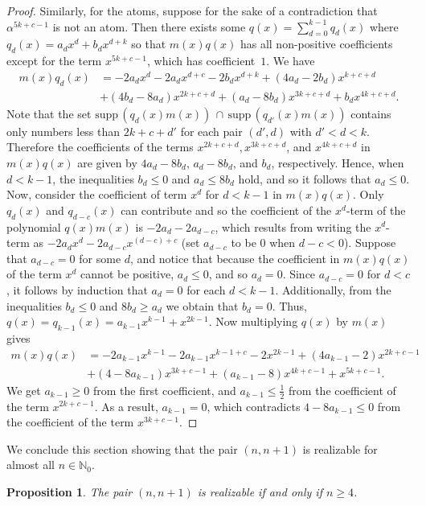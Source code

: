 \documentclass[11pt]{amsart}
\newtheorem{proposition}[theorem]{Proposition}
\theoremstyle{definition}
\theoremstyle{remark}
\numberwithin{equation}{section}
\newcommand{\nn}{\mathbb{N}}
\newcommand{\supp}{\text{supp}\,}
\begin{document}
\begin{proof}
    Similarly, for the atoms, suppose for the sake of a contradiction that $\alpha^{5k+c-1}$ is not an atom. Then there exists some $q(x)=\sum_{d=0}^{k-1}q_d(x)$ where $q_d(x)=a_dx^d+b_dx^{d+k}$ so that $m(x)q(x)$ has all non-positive coefficients except for the term $x^{5k+c-1}$, which has coefficient~$1$. We have
    \begin{align*}
    		m(x)q_d(x) &= -2a_dx^d-2a_dx^{d+c}-2b_dx^{d+k}+(4a_d-2b_d)x^{k+c+d} \\
    							&+(4b_d-8a_d)x^{2k+c+d}+(a_d-8b_d)x^{3k+c+d}+b_dx^{4k+c+d}.
    \end{align*}
	Note that the set $\supp(q_d(x)m(x))\,\cap\,\supp(q_{d'}(x)m(x))$ contains only numbers less than $2k+c+d'$  for each pair $(d',d)$ with $d'<d<k$. Therefore the coefficients of the terms $x^{2k+c+d}, x^{3k+c+d}$, and $x^{4k+c+d}$ in $m(x)q(x)$ are given by $4a_d-8b_d$, $a_d-8b_d$, and $b_d$, respectively. Hence, when $d<k-1$, the inequalities $b_d \le 0$ and $a_d \le 8b_d$ hold, and so it follows that $a_d \le 0$. Now, consider the coefficient of term $x^d$ for $d<k-1$ in $m(x)q(x)$. Only $q_d(x)$ and $q_{d-c}(x)$ can contribute and so the coefficient of the $x^d$-term of the polynomial $q(x)m(x)$ is $-2a_d - 2a_{d-c}$, which results from writing the $x^d$-term as $-2a_dx^d - 2a_{d-c}x^{(d-c) + c}$ (set $a_{d-c}$ to be $0$ when $d-c < 0$). Suppose that $a_{d-c}=0$ for some $d$, and notice that because the coefficient in $m(x)q(x)$ of the term $x^d$ cannot be positive, $a_d \le 0$, and so $a_d = 0$. Since $a_{d-c}=0$ for $d<c$, it follows by induction that $a_d = 0$ for each $d<k-1$. Additionally, from the inequalities $b_d\le 0$ and $8b_d \ge a_d$ we obtain that $b_d = 0$. Thus, $q(x) = q_{k-1}(x) = a_{k-1}x^{k-1}+x^{2k-1}$. Now multiplying $q(x)$ by $m(x)$ gives 
    \begin{align*}
    	m(x)q(x) &=-2a_{k-1}x^{k-1}-2a_{k-1}x^{{k-1}+c}-2x^{{2k-1}}+(4a_{k-1}-2)x^{{2k+c}-1} \\
    					&+(4-8a_{k-1})x^{3k+c-1}+(a_{k-1}-8)x^{4k+c-1}+x^{5k+c-1}.
    \end{align*}
	We get $a_{k-1} \ge 0$ from the first coefficient, and $a_{k-1}\le\frac12$ from the coefficient of the term $x^{2k+c-1}$. As a result, $a_{k-1} = 0$, which contradicts $4 - 8a_{k-1} \le 0$ from the coefficient of the term $x^{3k+c-1}$.
\end{proof}

We conclude this section showing that the pair $(n,n+1)$ is realizable for almost all $n \in \nn_0$.

\begin{proposition} \label{prop:m strong atoms and m+1 atoms}
    The pair $(n,n+1)$ is realizable if and only if $n \ge 4$.
\end{proposition}
\end{document}
